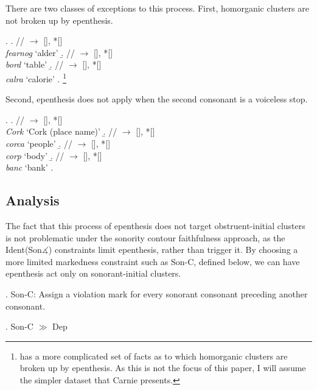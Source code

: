 \documentclass[12pt]{article}
\begin{document}
There are two classes of exceptions to this process.  First, homorganic clusters are not broken up by epenthesis.

\ex. \a. // $\rightarrow$ [], *[] \\
         {\it fearnog} `alder'
     \b. // $\rightarrow$ [], *[] \\
         {\it bord} `table'
     \b. // $\rightarrow$ [], *[] \\
         {\it calra} `calorie'  
     \z. 
     \citep[(52)]{carnie.1994}\footnote{\citet{ni.chiosain.1999} has a more complicated set of facts as to which homorganic clusters are broken up by epenthesis. As this is not the focus of this paper, I will assume the simpler dataset that Carnie presents.}

Second, epenthesis does not apply when the second consonant is a voiceless stop.

\ex. \a. // $\rightarrow$ [], *[] \\
         {\it Cork} `Cork (place name)' 
     \b. // $\rightarrow$ [], *[] \\
         {\it corca} `people' 
     \b. //  $\rightarrow$ [], *[] \\
         {\it corp} `body' 
     \b. // $\rightarrow$ [], *[] \\
         {\it banc} `bank'
     \z.
     \citep[(39a,b,c,26c)]{carnie.1994}

\subsection{Analysis}

The fact that this process of epenthesis does not target obstruent-initial clusters is not problematic under the sonority contour faithfulness approach,
as the {\sc Ident(Son$\measuredangle$)} constraints limit epenthesis, rather than trigger it.  By choosing a more limited markedness constraint such as {\sc *Son-C},
defined below, we can have epenthesis act only on sonorant-initial clusters.

\ex. {\sc *Son-C}: Assign a violation mark for every sonorant consonant preceding another consonant.

\ex. {\sc *Son-C} $\gg$ {\sc Dep}
\end{document}
